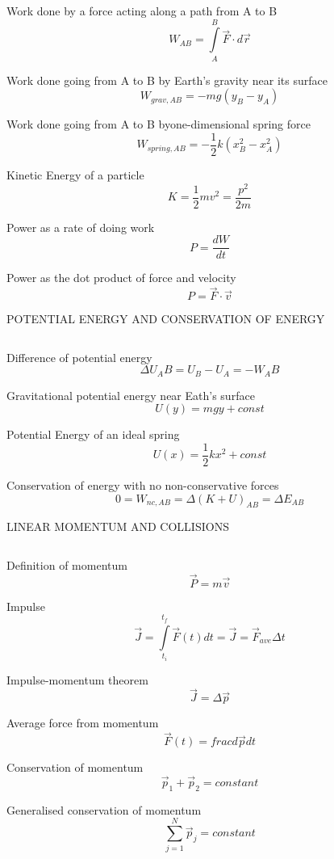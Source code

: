 \documentclass[12pt, letterpaper, twoside]{article}
\begin{document}
Work done by a force acting along a path from A to B
$$ W_{AB} = \int\limits_A^B \overrightarrow{F} \cdot d \overrightarrow{r} $$


Work done going from A to B by Earth's gravity near its surface
$$ W_{grav,AB} = -mg(y_B - y_A) $$


Work done going from A to B byone-dimensional spring force
$$ W_{spring,AB} = - \frac{1}{2} k (x_B^2 - x_A^2) $$


Kinetic Energy of a particle
$$ K = \frac{1}{2} m v^2 = \frac{p^2}{2m} $$


Power as a rate of doing work
$$ P = \frac{dW}{dt} $$


Power as the dot product of force and velocity
$$ P = \overrightarrow{F} \cdot \overrightarrow{v} $$



\newpage

POTENTIAL ENERGY AND CONSERVATION OF ENERGY

$$ $$

Difference of potential energy
$$ \Delta U_AB = U_B - U_A = -W_AB $$


Gravitational potential energy near Eath's surface
$$ U(y) = mgy + const $$


Potential Energy of an ideal spring
$$  U(x) = \frac{1}{2} k x^2 + const $$


Conservation of energy with no non-conservative forces
$$ 0 = W_{nc,AB} = \Delta (K + U)_{AB} = \Delta E_{AB} $$



\newpage

LINEAR MOMENTUM AND COLLISIONS

$$ $$

Definition of momentum
$$ \overrightarrow{P} = m \overrightarrow{v} $$


Impulse
$$ \overrightarrow{J} = \int\limits_{t_i}^{t_f} \overrightarrow{F}(t) dt  = \overrightarrow{J} = \overrightarrow{F}_{ave} \Delta t $$


Impulse-momentum theorem
$$ \overrightarrow{J} = \Delta \overrightarrow{p}$$


Average force from momentum
$$ \overrightarrow{F} (t) = frac{d \overrightarrow{p}}{dt} $$


Conservation of momentum
$$  \overrightarrow{p}_1 +  \overrightarrow{p}_2 = constant $$


Generalised conservation of momentum
$$  \displaystyle\sum_{j=1}^{N} \overrightarrow{p}_j = constant $$
\end{document}
